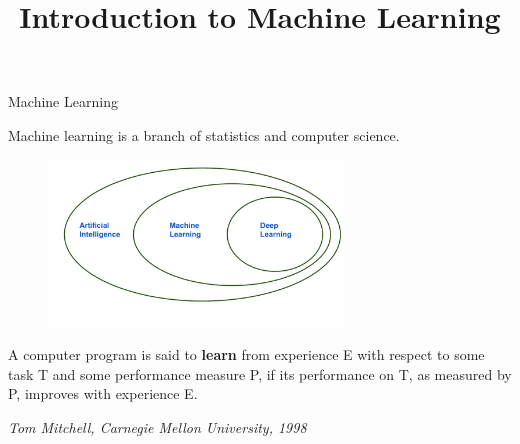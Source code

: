 \documentclass[11pt,compress,t,notes=noshow, xcolor=table]{beamer}
\title{Introduction to Machine Learning}
\institute{\href{https://compstat-lmu.github.io/lecture_i2ml/}{compstat-lmu.github.io/lecture\_i2ml}}
\date{}
\begin{document}












\sloppy


\begin{frame}{Machine Learning}

Machine learning is a branch of statistics and computer science. 

\begin{center}

  \begin{figure}
    \includegraphics[width=0.7\textwidth]{figure_man/learning}
  \end{figure}

  \fontsize{13pt}{13pt}\selectfont
  

  A computer program is said to \textbf{learn} from experience E with respect to
  some task T and some performance measure P, if its performance on T, as 
  measured by P, improves with experience E. \\
  
  \begin{footnotesize}
  \emph{Tom Mitchell, Carnegie Mellon University, 1998}
  \end{footnotesize}
  
  \end{center}
  
\end{frame}
\end{document}
